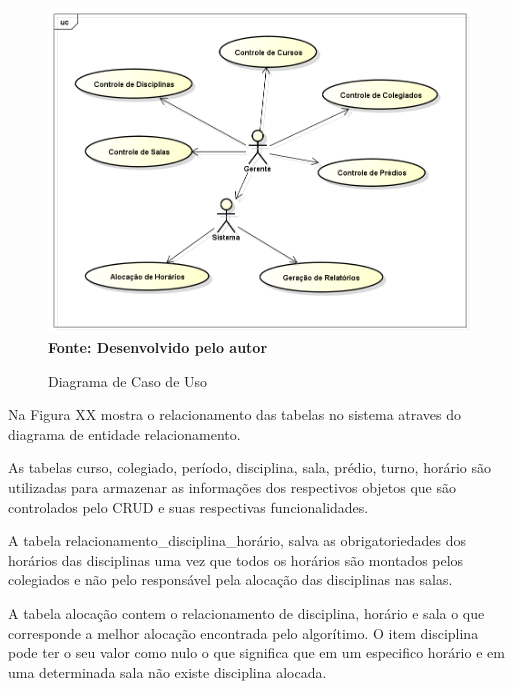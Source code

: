 \documentclass{abntpuc}
\begin{document}
\begin{figure}[!htb]
\caption[Diagrama de Caso de Uso]{Diagrama de Caso de Uso}
\label{fig:figura1}
\centering
\includegraphics[scale=0.4]{imagens/diagramaCasoUso.png}
\\ \textbf{\footnotesize Fonte: Desenvolvido pelo autor}
\end{figure}


Na Figura XX mostra o relacionamento das tabelas no sistema atraves do diagrama de entidade relacionamento.\par

As tabelas curso, colegiado, período, disciplina, sala, prédio, turno, horário são utilizadas para armazenar as informações dos respectivos objetos que são controlados pelo CRUD e suas respectivas funcionalidades.\par

A tabela relacionamento\_disciplina\_horário, salva as obrigatoriedades dos horários das disciplinas uma vez que todos os horários são montados pelos colegiados e não pelo responsável pela alocação das disciplinas nas salas.\par

A tabela alocação contem o relacionamento de disciplina, horário e sala o que corresponde a melhor alocação encontrada pelo algorítimo. O item disciplina pode ter o seu valor como nulo o que significa que em um especifico horário e em uma determinada sala não existe disciplina alocada.\par
\end{document}
